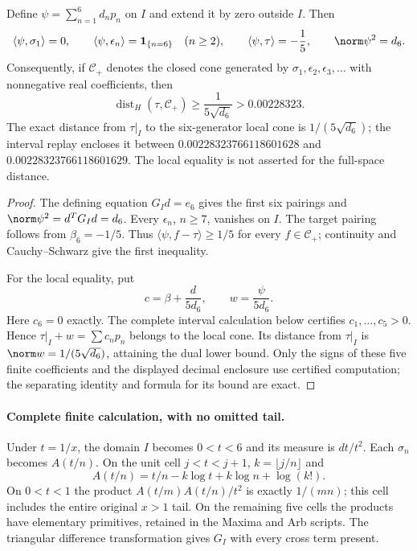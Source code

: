 \begin{proposition}
\label{prop:ns64-cone-distance}
Define $\psi=\sum_{n=1}^6d_np_n$ on $I$ and extend it by zero outside
$I$. Then
\[
 \langle\psi,\sigma_1\rangle=0,\qquad
 \langle\psi,\epsilon_n\rangle=\mathbf1_{\{n=6\}}\quad(n\geq2),
 \qquad \langle\psi,\tau\rangle=-\frac15,
 \qquad \norm\psi^2=d_6.
\]
Consequently, if $\mathcal C_+$ denotes the closed cone generated by
$\sigma_1,\epsilon_2,\epsilon_3,\ldots$ with nonnegative real
coefficients, then
\begin{equation}
 \operatorname{dist}_H(\tau,\mathcal C_+)
 \geq\frac1{5\sqrt{d_6}}>0.00228323.
 \label{eq:ns64-positive-gap}
\end{equation}
The exact distance from $\tau|_I$ to the six-generator local cone is
$1/(5\sqrt{d_6})$; the interval replay encloses it between
$0.00228323766118601628$ and $0.00228323766118601629$.
The local equality is not asserted for the full-space distance.
\end{proposition}
\begin{proof}
The defining equation $G_Id=e_6$ gives the first six pairings and
$\norm\psi^2=d^TG_Id=d_6$. Every $\epsilon_n$, $n\geq7$, vanishes
on $I$. The target pairing follows from $\beta_6=-1/5$.
Thus $\langle\psi,f-\tau\rangle\geq1/5$ for every $f\in\mathcal C_+$;
continuity and Cauchy--Schwarz give the first inequality.

For the local equality, put
\[
 c=\beta+\frac{d}{5d_6},\qquad w=\frac{\psi}{5d_6}.
\]
Here $c_6=0$ exactly. The complete interval calculation below certifies
$c_1,\ldots,c_5>0$. Hence $\tau|_I+w=\sum c_np_n$ belongs to the
local cone. Its distance from $\tau|_I$ is $\norm w=1/(5\sqrt{d_6})$,
attaining the dual lower bound. Only the signs of these five finite
coefficients and the displayed decimal enclosure use certified
computation; the separating identity and formula for its bound are exact.
\end{proof}

\paragraph{Complete finite calculation, with no omitted tail.}
Under $t=1/x$, the domain $I$ becomes $0<t<6$ and its measure is
$dt/t^2$. Each $\sigma_n$ becomes $A(t/n)$. On the unit cell
$j<t<j+1$, $k=\lfloor j/n\rfloor$ and
\[
 A(t/n)=t/n-k\log t+k\log n+\log(k!).
\]
On $0<t<1$ the product $A(t/m)A(t/n)/t^2$ is exactly $1/(mn)$;
this cell includes the entire original $x>1$ tail. On the remaining
five cells the products have elementary primitives, retained in the
Maxima and Arb scripts. The triangular difference transformation gives
$G_I$ with every cross term present.

